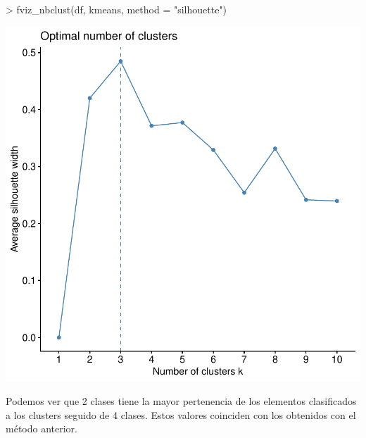 \documentclass [a4paper] {article}
\begin{document}
\begin{center}
\begin{Schunk}
\begin{Sinput}
> fviz_nbclust(df, kmeans, method = "silhouette")
\end{Sinput}
\end{Schunk}
\includegraphics{entrega-optimal_number_of_clusters_4}
\end{center}

Podemos ver que 2 clases tiene la mayor pertenencia de los elementos clasificados a los clusters seguido de 4 clases.
Estos valores coinciden con los obtenidos con el método anterior.
\end{document}
